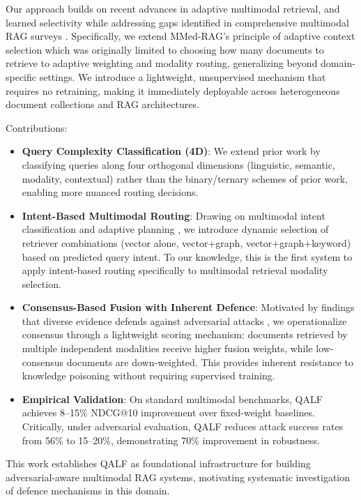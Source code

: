 \documentclass[11pt]{article}
\begin{document}
Our approach builds on recent advances in adaptive multimodal retrieval, \cite{yu_cogplanner_2025,li_benchmarking_2025} and learned selectivity \cite{shi_making_2025} while addressing gaps identified in comprehensive multimodal RAG surveys \cite{mei_survey_2025}. Specifically, we extend MMed-RAG's \cite{xia_mmed-rag_2025} principle of adaptive context selection which was originally limited to choosing how many documents to retrieve to adaptive weighting and modality routing, generalizing beyond domain-specific settings. We introduce a lightweight, unsupervised mechanism that requires no retraining, making it immediately deployable across heterogeneous document collections and RAG architectures.

Contributions:
\begin{itemize}
    \item \textbf{Query Complexity Classification (4D)}: We extend prior work \cite{jeong_adaptive-rag_2024} by classifying queries along four orthogonal dimensions (linguistic, semantic, modality, contextual) rather than the binary/ternary schemes of prior work, enabling more nuanced routing decisions.
    \item \textbf{Intent-Based Multimodal Routing}: Drawing on multimodal intent classification \cite{xia_mmed-rag_2025} and adaptive planning \cite{yu_cogplanner_2025,li_benchmarking_2025}, we introduce dynamic selection of retriever combinations (vector alone, vector+graph, vector+graph+keyword) based on predicted query intent. To our knowledge, this is the first system to apply intent-based routing specifically to multimodal retrieval modality selection.
    \item \textbf{Consensus-Based Fusion with Inherent Defence}: Motivated by findings that diverse evidence defends against adversarial attacks \cite{amirshahi_evaluating_2025}, we operationalize consensus through a lightweight scoring mechanism: documents retrieved by multiple independent modalities receive higher fusion weights, while low-consensus documents are down-weighted. This provides inherent resistance to knowledge poisoning \cite{ha_mm-poisonrag_2025} without requiring supervised training.
    \item \textbf{Empirical Validation}: On standard multimodal benchmarks, QALF achieves 8–15\% NDCG@10 improvement over fixed-weight baselines. Critically, under adversarial evaluation, QALF reduces attack success rates from 56\% to 15–20\%, demonstrating 70\% improvement in robustness.
\end{itemize}
This work establishes QALF as foundational infrastructure for building adversarial-aware multimodal RAG systems, motivating systematic investigation of defence mechanisms in this domain.
\end{document}
